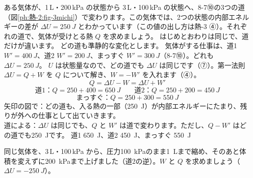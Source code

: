 \label{ph:熱-2:ex5}
\begin{phreidai}
ある気体が、1\,L・200\,kPa の状態から 3\,L・100\,kPa の状態へ、8-7⑩の3つの道（図\ref{ph:熱-2:fig-3michi}）で変わります。この気体では、2つの状態の内部エネルギーの差が $\Delta U=\qty{250}{J}$ とわかっています（この値の出し方は熱-3 ④）。それぞれの道で、気体が受けとる熱 $Q$ を求めましょう。
\phbamen
はじめとおわりは同じで、道だけが違います。
\phmushi
どの道も準静的な変化とします。
\phzu
気体がする仕事は、道1 $W'=\qty{400}{J}$、道2 $W'=\qty{200}{J}$、まっすぐ $W'=\qty{300}{J}$（8-7⑩）。どれも $\Delta U=\qty{250}{J}$。
\phriyu
$U$ は状態量なので、どの道でも $\Delta U$ は同じです（⑦）。第一法則 $\Delta U=Q+W$ を $Q$ について解き、$W=-W'$ を入れます（④）。
\phtateru
\[Q=\Delta U-W=\Delta U+W'\]
\phtoku
\[\text{道1：}Q=250+400=\qty{650}{J}\qquad\text{道2：}Q=250+200=\qty{450}{J}\]
\[\text{まっすぐ：}Q=250+300=\qty{550}{J}\]
\phtashikame
矢印の図で：どの道も、入る熱の一部（\qty{250}{J}）が内部エネルギーにたまり、残りが外への仕事として出ていきます。\\
道による：$\Delta U$ は同じでも、$Q$ と $W'$ は道で変わります。ただし、$Q-W'$ はどの道でも\qty{250}{J}です。
\kotae 道1 \qty{650}{J}、道2 \qty{450}{J}、まっすぐ \qty{550}{J}
\end{phreidai}
\begin{jibun}
同じ気体を、3\,L・100\,kPa から、圧力\qty{100}{kPa}のまま\qty{1}{L}まで縮め、そのあと体積を変えずに\qty{200}{kPa}まで上げました（道2の逆）。$W$ と $Q$ を求めましょう（$\Delta U=-\qty{250}{J}$）。
\end{jibun}

